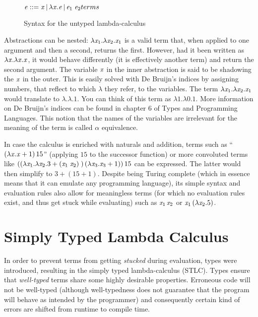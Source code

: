 \begin{figure}
  \centering
  $\term ::= \tmVar\,|\,\lambda \tmVar.\term\,|\,\term_1 \; \term_2  \hfill terms $\\
  \caption{Syntax for the untyped lambda-calculus}
  \label{untypedsyntax}
\end{figure}
Abstractions can be nested: $\lambda \mathit{x}_1. \lambda \mathit{x}_2 .\mathit{x}_1$ is a valid term that, when applied to one argument and then a second, returns the first. However, had it been written as $\lambda \mathit{x}. \lambda \mathit{x}. \mathit{x}$, it would behave differently (it is effectively another term) and return the second argument. The variable $\mathit{x}$ in the inner abstraction is said to be shadowing the $\mathit{x}$ in the outer. This is easily solved with De Bruijn's indices by assigning numbers, that reflect to which $\lambda$ they refer, to the variables. The term $\lambda \mathit{x}_1. \lambda \mathit{x}_2 .\mathit{x}_1$ would translate to $\lambda .\lambda.1$. You can think of this term as $\lambda 1.\lambda 0.1$. More information on De Bruijn's indices can be found in chapter 6 of Types and Programming Languages\cite{tapl}. This notion that the names of the variables are irrelevant for the meaning of the term is called $\alpha$ equivalence.

In case the calculus is enriched with naturals and addition, terms such as ``$(\lambda \mathit{x}.\mathit{x} + 1)\,15$'' (applying $15$ to the successor function) or more convoluted terms like $((\lambda \mathit{x}_1. \lambda \mathit{x}_2 .3 + (\mathit{x}_1\;\mathit{x}_2)\;) \, (\lambda \mathit{x}_3.\mathit{x}_3 + 1))\,15$ can be expressed. The latter would then simplify to $3+(15+1)$. Despite being Turing complete (which in essence means that it can emulate any programming language), its simple syntax and evaluation rules also allow for meaningless terms (for which no evaluation rules exist, and thus get stuck while evaluating) such as $\mathit{x}_1 \, \mathit{x}_2$ or $\mathit{x}_1 \, (\lambda \mathit{x}_2.5)$.

\section{Simply Typed Lambda Calculus}
\label{2.2}
In order to prevent terms from getting \textit{stucked} during evaluation, types were introduced, resulting in the simply typed lambda-calculus (STLC). Types ensure that \textit{well-typed} terms share some highly desirable properties. Erroneous code will not be well-typed (although well-typedness does not guarantee that the program will behave as intended by the programmer) and consequently certain kind of errors are shifted from runtime to compile time.
